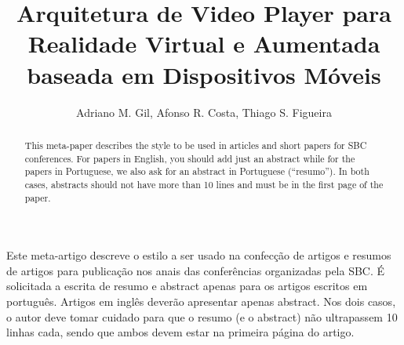 \documentclass[12pt]{article}
\title{Arquitetura de Video Player para Realidade Virtual e Aumentada baseada em Dispositivos Móveis}
\author{Adriano M. Gil\inst{1}, Afonso R. Costa\inst{1},  Thiago S. Figueira\inst{1}}
\begin{document}
\maketitle

\begin{abstract}
  This meta-paper describes the style to be used in articles and short papers
  for SBC conferences. For papers in English, you should add just an abstract
  while for the papers in Portuguese, we also ask for an abstract in
  Portuguese (``resumo''). In both cases, abstracts should not have more than
  10 lines and must be in the first page of the paper.
\end{abstract}

\begin{resumo}
  Este meta-artigo descreve o estilo a ser usado na confecção de artigos e
  resumos de artigos para publicação nos anais das conferências organizadas
  pela SBC. É solicitada a escrita de resumo e abstract apenas para os artigos
  escritos em português. Artigos em inglês deverão apresentar apenas abstract.
  Nos dois casos, o autor deve tomar cuidado para que o resumo (e o abstract)
  não ultrapassem 10 linhas cada, sendo que ambos devem estar na primeira
  página do artigo.
\end{resumo}










\end{document}
